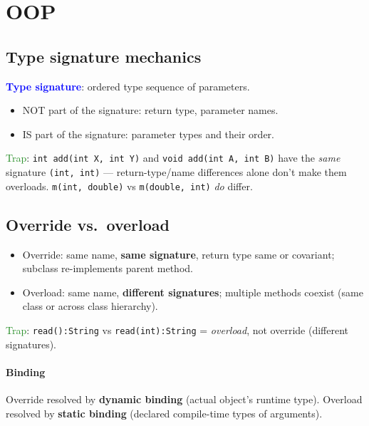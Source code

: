 \section{OOP}

\subsection{Type signature mechanics}
\textcolor{Blue}{\textbf{Type signature}}: ordered type sequence of parameters.
\begin{itemize}
  \item \textcolor{Bittersweet}{NOT} part of the signature: return type, parameter names.
  \item \textcolor{Bittersweet}{IS} part of the signature: parameter types and their order.
\end{itemize}
\textcolor{ForestGreen}{Trap}: \texttt{int add(int X, int Y)} and \texttt{void add(int A, int B)} have the \emph{same} signature \texttt{(int, int)} — return-type/name differences alone don't make them overloads. \texttt{m(int, double)} vs \texttt{m(double, int)} \emph{do} differ.

\subsection{Override vs.\ overload}
\begin{itemize}
  \item \textcolor{Bittersweet}{Override}: same name, \textbf{same signature}, return type same or covariant; subclass re-implements parent method.
  \item \textcolor{Bittersweet}{Overload}: same name, \textbf{different signatures}; multiple methods coexist (same class or across class hierarchy).
\end{itemize}
\textcolor{ForestGreen}{Trap}: \texttt{read():String} vs \texttt{read(int):String} = \emph{overload}, not override (different signatures).
\paragraph{Binding}
\textcolor{Bittersweet}{Override} resolved by \textbf{dynamic binding} (actual object's runtime type).
\textcolor{Bittersweet}{Overload} resolved by \textbf{static binding} (declared compile-time types of arguments).

